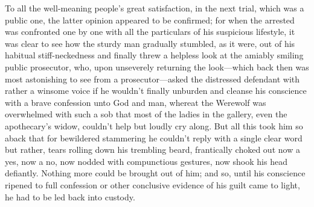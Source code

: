 \documentclass[12pt,a4paper]{article}
\begin{document}
To all the well-meaning people’s great satisfaction, in the next trial, which was a public one, the latter opinion appeared to be confirmed; for when the arrested was confronted one by one with all the particulars of his suspicious lifestyle, it was clear to see how the sturdy man gradually stumbled, as it were, out of his habitual stiff-neckedness and finally threw a helpless look at the amiably smiling public prosecutor, who, upon unseverely returning the look—which back then was most astonishing to see from a prosecutor—asked the distressed defendant with rather a winsome voice if he wouldn’t finally unburden and cleanse his conscience with a brave confession unto God and man, whereat the Werewolf was overwhelmed with such a sob that most of the ladies in the gallery, even the apothecary’s widow, couldn’t help but loudly cry along. But all this took him so aback that for bewildered stammering he couldn’t reply with a single clear word but rather, tears rolling down his trembling beard, frantically choked out now a yes, now a no, now nodded with compunctious gestures, now shook his head defiantly. Nothing more could be brought out of him; and so, until his conscience ripened to full confession or other conclusive evidence of his guilt came to light, he had to be led back into custody.
\end{document}
